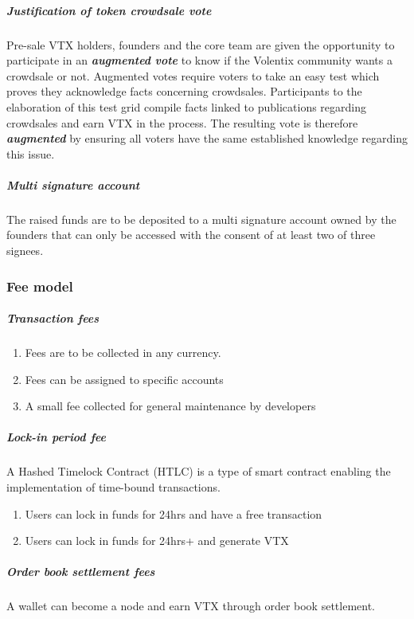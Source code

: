 \documentclass[]{article}
\begin{document}
{\begin{table}[h!]
\end{table}

\subparagraph{Justification of token crowdsale vote}
Pre-sale VTX holders, founders and the core team are given the opportunity to participate in an \textbf{\textit{augmented} \textit{vote}}\cite{21} 
to know if the Volentix community wants a crowdsale or not. 
Augmented votes require voters to take an easy test which proves they acknowledge facts concerning crowdsales. 
Participants to the elaboration of this test grid compile facts linked to publications regarding crowdsales and earn VTX in the process. 
The resulting vote is therefore \textit{\textbf{augmented}} by ensuring all voters have the same established knowledge regarding this issue.  

\subparagraph{Multi signature account}
The raised funds are to be deposited to a multi signature account owned by the founders 
that can only be accessed with the consent of at least two of three signees.

\subsubsection{Fee model}
\subparagraph{Transaction fees\\}
\begin{enumerate}
	\item Fees are to be collected in any currency.\\
	\item Fees can be assigned to specific accounts\\
	\item A small fee collected for general maintenance by developers\\
\end{enumerate}
\subparagraph{Lock-in period fee\\}
	A Hashed Timelock Contract (HTLC)\cite{22} is a type of smart contract enabling the implementation of time-bound transactions.
\begin{enumerate}
	\item Users can lock in funds for 24hrs and have a free transaction\\
	\item Users can lock in funds for 24hrs+ and generate VTX \\
\end{enumerate}
\subparagraph{Order book settlement fees}
A wallet can become a node and earn VTX through order book settlement. 


}
\end{document}
